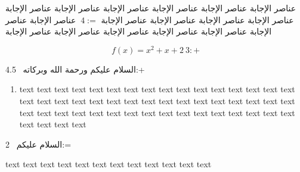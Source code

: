 \documentclass[12pt]{article}
\begin{document}
\begin{correction}
عناصر الإجابة عناصر الإجابة عناصر الإجابة عناصر الإجابة عناصر الإجابة عناصر الإجابة عناصر الإجابة عناصر الإجابة عناصر الإجابة عناصر الإجابة $~4:=$ عناصر الإجابة عناصر الإجابة عناصر الإجابة عناصر الإجابة عناصر الإجابة عناصر الإجابة عناصر الإجابة

\[ f(x)=x^2+x+2  ~3:+ \]

السلام عليكم ورحمة الله وبركاته ~4.5:+ 

\begin{enumerate}
\item
text text  text  text  text  text  text  text  text  text  text  text  text  text  text  text  text  text  text  text  text  text  text  text  text  text  text  text  text  text  text  text  text  text  text  text  text  text  text  text  text  text  text  text  text  text  text  text  text  text  text  text   
\end{enumerate}

السلام عليكم ~2:=

text text  text  text  text  text  text  text  text  text  text  text 
\nl
\stretchtable 
\end{correction}
\end{document}
